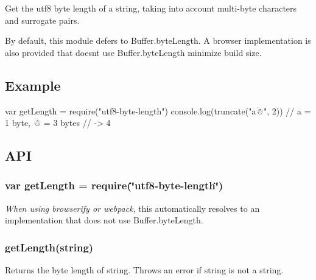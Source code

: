 Get the utf8 byte length of a string, taking into account multi-\/byte characters and surrogate pairs.

By default, this module defers to {\ttfamily Buffer.\+byte\+Length}. A browser implementation is also provided that doesn\textquotesingle{}t use {\ttfamily Buffer.\+byte\+Length} minimize build size.

\subsection*{Example}


\begin{DoxyCode}
var getLength = require("utf8-byte-length")
console.log(truncate("a☃", 2)) // a = 1 byte, ☃ = 3 bytes
// -> 4
\end{DoxyCode}


\subsection*{A\+PI}

\subsubsection*{{\ttfamily var get\+Length = require(\char`\"{}utf8-\/byte-\/length\char`\"{})}}

{\itshape When using browserify or webpack}, this automatically resolves to an implementation that does not use {\ttfamily Buffer.\+byte\+Length}.

\subsubsection*{{\ttfamily get\+Length(string)}}

Returns the byte length of {\ttfamily string}. Throws an error if {\ttfamily string} is not a string. 